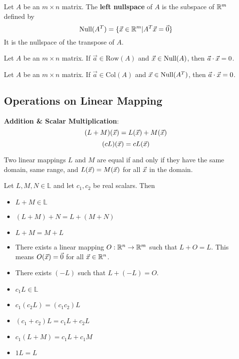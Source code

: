 \documentclass[english, 12pt]{article}
\begin{document}
\begin{defn}
Let $A$ be an $m \times n$ matrix. The \textbf{left nullspace} of $A$ is the subspace of ${\mathbb{R}}^m$ defined by
\[\text{Null}(A^T) = \{\vec{x} \in {\mathbb{R}}^m | A^T \vec{x} = \vec{0}\}\]
It is the nullspace of the transpose of $A$.
\end{defn}

\begin{thrm}
Let $A$ be an $m \times n$ matrix. If $\vec{a} \in \text{Row}(A)$ and $\vec{x} \in \text{Null}(A)$, then $\vec{a} \cdot \vec{x} = 0$.
\end{thrm}

\begin{thrm}
Let $A$ be an $m \times n$ matrix. If $\vec{a} \in \text{Col}(A)$ and $\vec{x} \in \text{Null}(A^T)$, then $\vec{a} \cdot \vec{x} = 0$.
\end{thrm}

\subsection{Operations on Linear Mapping}

\begin{defn}
\textbf{Addition \& Scalar Multiplication}:
\[(L + M)(\vec{x}) = L(\vec{x}) + M(\vec{x})\]
\[(cL)(\vec{x}) = c L(\vec{x})\]
\end{defn}

\begin{note}
Two linear mappings $L$ and $M$ are equal if and only if they have the same domain, same range, and $L(\vec{x}) = M(\vec{x})$ for all $\vec{x}$ in the domain.
\end{note}

\begin{thrm}
Let $L,M,N \in \mathbb{L}$ and let $c_{1},c_{2}$ be real scalars. Then
\begin{itemize}
\item $L + M \in \mathbb{L}$
\item $(L + M) + N = L + (M + N)$
\item $L + M = M + L$
\item There exists a linear mapping $O: {\mathbb{R}}^n \rightarrow {\mathbb{R}}^m$ such that $L + O = L$. This means $O(\vec{x}) = \vec{0}$ for all $\vec{x} \in {\mathbb{R}}^n$.
\item There exists $(-L)$ such that $L + (-L) = O$.
\item $c_{1} L \in \mathbb{L}$
\item $c_{1} (c_{2} L) = (c_{1} c_{2}) L$
\item $(c_{1} + c_{2}) L = c_{1} L + c_2 L$
\item $c_{1} (L + M) = c_1 L + c_1 M$
\item $1L = L$
\end{itemize}
\end{thrm}
\end{document}
